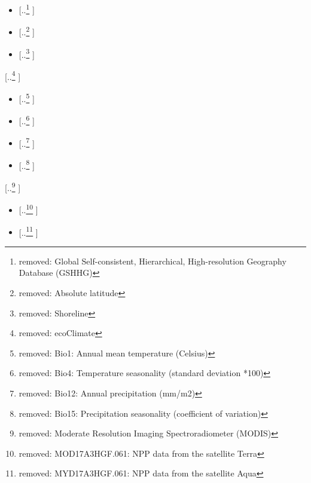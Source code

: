 \documentclass[unnumsec,webpdf,modern,medium]{oup-authoring-template}
\providecommand{\DIFdeltex}[1]{{\protect\color{red} [..\footnote{removed: #1} ]}} %
\providecommand{\DIFdel}[1]{\texorpdfstring{\DIFdeltex{#1}}{}} %
\begin{document}
\begin{itemize}%
\item%
\DIFdel{Global Self-consistent, Hierarchical, High-resolution Geography Database (GSHHG)
}%
\item%
\DIFdel{Absolute latitude
    }%
\item%
\DIFdel{Shoreline
}
\end{itemize}%
\DIFdel{ecoClimate
}%
\begin{itemize}%
\item%
\DIFdel{Bio1: Annual mean temperature (Celsius)
}%
\item%
\DIFdel{Bio4: Temperature seasonality (standard deviation *100)
}%
\item%
\DIFdel{Bio12: Annual precipitation (mm/m2)
}%
\item%
\DIFdel{Bio15: Precipitation seasonality (coefficient of variation)
}
\end{itemize}%
\DIFdel{Moderate Resolution Imaging Spectroradiometer (MODIS)
}%
\begin{itemize}%
\item%
\DIFdel{MOD17A3HGF.061: NPP data from the satellite Terra
    }%
\item%
\DIFdel{MYD17A3HGF.061: NPP data from the satellite Aqua
}
\end{itemize}%
\end{document}
